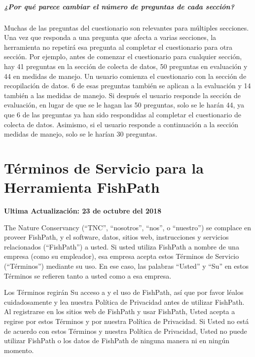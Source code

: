 \documentclass[
  11pt,
]{book}
\begin{document}
\hypertarget{faq-question-numbering}{%
\paragraph{¿Por qué parece cambiar el número de preguntas de cada sección?}\label{faq-question-numbering}}

Muchas de las preguntas del cuestionario son relevantes para múltiples secciones. Una vez que responda a una pregunta que afecta a varias secciones, la herramienta no repetirá esa pregunta al completar el cuestionario para otra sección. Por ejemplo, antes de comenzar el cuestionario para cualquier sección, hay 41 preguntas en la sección de colecta de datos, 50 preguntas en evaluación y 44 en medidas de manejo. Un usuario comienza el cuestionario con la sección de recopilación de datos. 6 de esas preguntas también se aplican a la evaluación y 14 también a las medidas de manejo. Si después el usuario responde la sección de evaluación, en lugar de que se le hagan las 50 preguntas, solo se le harán 44, ya que 6 de las preguntas ya han sido respondidas al completar el cuestionario de colecta de datos. Asimismo, si el usuario responde a continuación a la sección medidas de manejo, solo se le harían 30 preguntas.

\hypertarget{terms}{%
\chapter{Términos de Servicio para la Herramienta FishPath}\label{terms}}

\textbf{Ultima Actualización: 23 de octubre del 2018}

The Nature Conservancy (``TNC'', ``nosotros'', ``nos'', o ``nuestro'') se complace en proveer FishPath, y el software, datos, sitios web, instrucciones y servicios relacionados (``FishPath'') a usted. Si usted utiliza FishPath a nombre de una empresa (como su empleador), esa empresa acepta estos Términos de Servicio (``Términos'') mediante su uso. En ese caso, las palabras ``Usted'' y ``Su'' en estos Términos se refieren tanto a usted como a esa empresa.

Los Términos regirán Su acceso a y el uso de FishPath, así que por favor léalos cuidadosamente y lea nuestra Política de Privacidad antes de utilizar FishPath. Al registrarse en los sitios web de FishPath y usar FishPath, Usted acepta a regirse por estos Términos y por nuestra Política de Privacidad. Si Usted no está de acuerdo con estos Términos y nuestra Política de Privacidad, Usted no puede utilizar FishPath o los datos de FishPath de ninguna manera ni en ningún momento.
\end{document}
